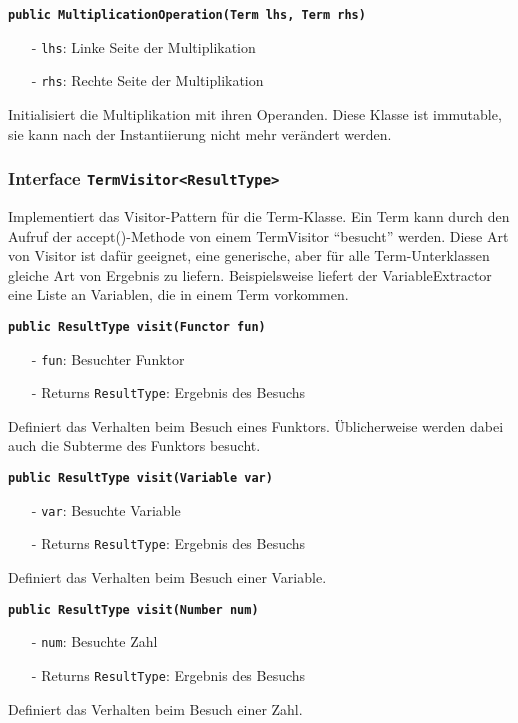 \documentclass[parskip=full,11pt,twoside]{scrartcl}
\begin{document}
\textbf{\texttt{public MultiplicationOperation(Term lhs, Term rhs)}}
\begin{itemize}[noitemsep]
	\item[-] \texttt{lhs}: Linke Seite der Multiplikation
	\item[-] \texttt{rhs}: Rechte Seite der Multiplikation
\end{itemize}
Initialisiert die Multiplikation mit ihren Operanden. Diese Klasse ist immutable, sie kann nach der Instantiierung nicht mehr verändert werden.
\subsubsection{Interface \texttt{TermVisitor<ResultType>}}
Implementiert das Visitor-Pattern für die Term-Klasse. Ein Term kann durch den Aufruf der accept()-Methode von einem TermVisitor \enquote{besucht} werden. Diese Art von Visitor ist dafür geeignet, eine generische, aber für alle Term-Unterklassen gleiche Art von Ergebnis zu liefern. Beispielsweise liefert der VariableExtractor eine Liste an Variablen, die in einem Term vorkommen.

\textbf{\texttt{public ResultType visit(Functor fun)}}
\begin{itemize}[noitemsep]
	\item[-] \texttt{fun}: Besuchter Funktor
	\item[-] Returns \texttt{ResultType}: Ergebnis des Besuchs
\end{itemize}
Definiert das Verhalten beim Besuch eines Funktors. Üblicherweise werden dabei auch die Subterme des Funktors besucht.

\textbf{\texttt{public ResultType visit(Variable var)}}
\begin{itemize}[noitemsep]
	\item[-] \texttt{var}: Besuchte Variable
	\item[-] Returns \texttt{ResultType}: Ergebnis des Besuchs
\end{itemize}
Definiert das Verhalten beim Besuch einer Variable.

\textbf{\texttt{public ResultType visit(Number num)}}
\begin{itemize}[noitemsep]
	\item[-] \texttt{num}: Besuchte Zahl
	\item[-] Returns \texttt{ResultType}: Ergebnis des Besuchs
\end{itemize}
Definiert das Verhalten beim Besuch einer Zahl.
\end{document}
